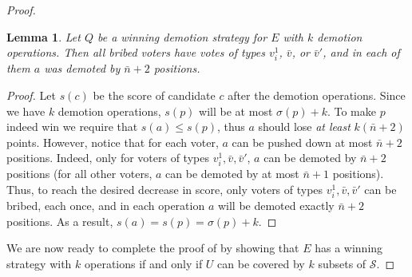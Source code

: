 \documentclass[letterpaper]{article} %
\newtheorem{lemma}{Lemma}
\newcommand{\diff}{\mathrm{diff}}
\begin{document}
\begin{proof}



\begin{lemma}\label{lem:pushed}
Let $Q$ be a winning demotion strategy for $E$ with $k$ demotion operations. Then all bribed voters have votes of types $v_i^1$, $\bar{v}$, or $\bar{v}'$, and in each of them  $a$ was demoted by $\bar{n}+2$ positions.
\end{lemma}
\begin{proof}
Let $s(c)$ be the score of candidate $c$ after the demotion operations.
Since we have $k$ demotion operations, $s(p)$ will be at most $\sigma(p)+k$. To make $p$ indeed win we require that $s(a) \leq s(p)$, thus $a$ should lose \emph{at least} $k(\bar{n}+2)$ points. However, notice that for each voter, $a$ can be pushed down at most $\bar{n}+2$ positions. Indeed, only for voters of types $v_i^1, \bar{v}, \bar{v}'$, $a$ can be demoted by $\bar{n}+2$ positions (for all other voters, $a$ can be demoted by at most $\bar{n}+1$ positions). Thus, to reach the desired decrease in score, only voters of types $v_i^1, \bar{v}, \bar{v}'$ can be bribed, each once, and in each operation  $a$ will be demoted exactly $\bar{n}+2$ positions. As a result, $s(a)=s(p)=\sigma(p)+k$.
    \end{proof}
We are now ready to complete the proof of  by showing that
$E$ has a winning strategy with $k$ operations if and only if $U$ can be covered by $k$ subsets of $\mathcal{S}$.


\end{proof}
\end{document}
